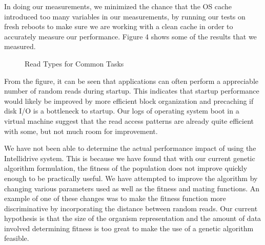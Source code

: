 \documentclass[letterpaper,twocolumn,10pt]{article}
\begin{document}
In doing our measurements, we minimized the chance that the OS cache introduced too many variables in our measurements, by running our tests on fresh reboots to make sure we are working with a clean cache in order to accurately measure our performance.  Figure 4 shows some of the results that we measured.

\begin{figure}[htb]
  \caption{Read Types for Common Tasks}
\end{figure}
 
From the figure, it can be seen that applications can often perform a appreciable number of random reads during startup.  This indicates that startup performance would likely be improved by more efficient block organization and precaching if disk I/O is a bottleneck to startup.  Our logs of operating system boot in a virtual machine suggest that the read access patterns are already quite efficient with some, but not much room for improvement.

We have not been able to determine the actual performance impact of using the Intellidrive system.  This is because we have found that with our current genetic algorithm formulation, the fitness of the population does not improve quickly enough to be practically useful.  We have attempted to improve the algorithm by changing various parameters used as well as the fitness and mating functions.  An example of one of these changes was to make the fitness function more discriminative by incorporating the distance between random reads.  Our current hypothesis is that the size of the organism representation and the amount of data involved determining fitness is too great to make the use of a genetic algorithm feasible.
\end{document}
